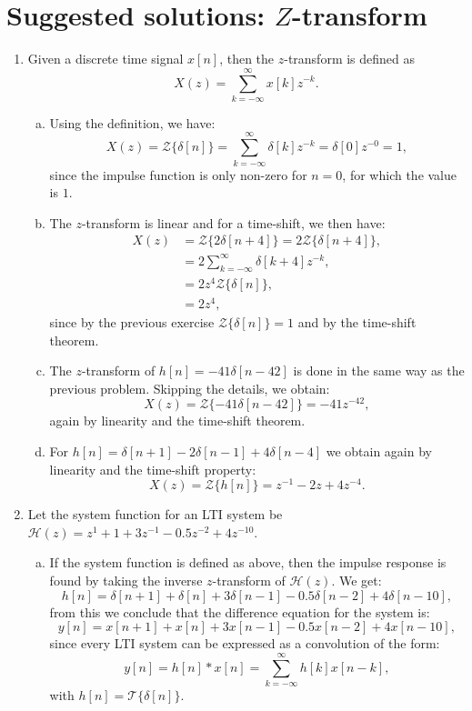 \newpage
\section{Suggested solutions: $Z$-transform}

\begin{enumerate}
\item Given a discrete time signal $x[n]$, then the $z$-transform is defined as
$$X(z)=\sum_{k=-\infty}^{\infty}x[k]z^{-k}.$$

\begin{enumerate}[a)]

\item Using the definition, we have:
$$X(z)=\mathcal{Z}\{\delta[n]\}=\sum_{k=-\infty}^{\infty}\delta[k]z^{-k}=\delta[0]z^{-0}=1,$$
since the impulse function is only non-zero for $n=0$, for which the value is $1$. 

\item The $z$-transform is linear and for a time-shift, we then have:
\begin{align*}
    X(z)&=\mathcal{Z}\{2\delta[n+4]\}=2\mathcal{Z}\{\delta[n+4]\}, \\
    &=2\sum_{k=-\infty}^{\infty}\delta[k+4]z^{-k}, \\
    &=2z^{4}\mathcal{Z}\{\delta[n]\}, \\
    &=2z^{4},
\end{align*}
since by the previous exercise $\mathcal{Z}\{\delta[n]\}=1$ and by the time-shift theorem. 

\item The $z$-transform of $h[n]=-41\delta[n-42]$ is done in the same way as the previous problem. Skipping the details, we obtain:
$$X(z)=\mathcal{Z}\{-41\delta[n-42]\}=-41z^{-42},$$
again by linearity and the time-shift theorem.

\item For $h[n]=\delta[n+1]-2\delta[n-1]+4\delta[n-4]$ we obtain again by linearity and the time-shift property:
$$X(z)=\mathcal{Z}\{h[n]\}=z^{-1}-2z+4z^{-4}.$$
\end{enumerate}

\item Let the system function for an LTI system be $\mathcal{H}(z)=z^{1}+1+3z^{-1}-0.5z^{-2}+4z^{-10}$.

\begin{enumerate}[a)]

\item If the system function is defined as above, then the impulse response is found by taking the inverse $z$-transform of $\mathcal{H}(z)$. We get:
$$h[n]=\delta[n+1]+\delta[n]+3\delta[n-1]-0.5\delta[n-2]+4\delta[n-10],$$
from this we conclude that the difference equation for the system is:
$$y[n]=x[n+1]+x[n]+3x[n-1]-0.5x[n-2]+4x[n-10],$$
since every LTI system can be expressed as a convolution of the form:
$$y[n]=h[n]*x[n]=\sum_{k=-\infty}^{\infty}h[k]x[n-k],$$
with $h[n]=\mathcal{T}\{\delta[n]\}$. 


\end{enumerate}
\end{enumerate}
